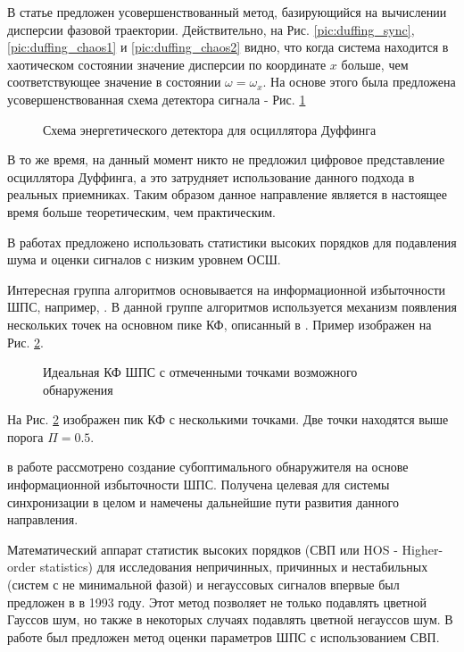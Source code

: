 В статье \cite{chaos_chen} предложен усовершенствованный метод, базирующийся на вычислении дисперсии
фазовой траектории. Действительно, на Рис. \ref{pic:duffing_sync}, \ref{pic:duffing_chaos1} и
\ref{pic:duffing_chaos2} видно, что когда система находится в хаотическом состоянии значение
дисперсии по координате ${x}$ больше, чем соответствующее значение в состоянии $\omega = \omega_{x}$.
На основе этого была предложена усовершенствованная схема детектора сигнала - Рис. \ref{pic:chaos_energy_detector}
\begin{figure}[h]
	\center{}
	\caption{Схема энергетического детектора для осциллятора Дуффинга}
	\label{pic:chaos_energy_detector}
\end{figure}

В то же время, на данный момент никто не предложил цифровое представление осциллятора Дуффинга, а это затрудняет использование данного подхода
в реальных приемниках. Таким образом данное направление является в настоящее время больше теоретическим, чем практическим.

В работах \cite{hos_petropulu, hos_zhao} предложено использовать статистики высоких порядков для подавления шума и оценки
сигналов с низким уровнем ОСШ.

Интересная группа алгоритмов основывается на информационной избыточности ШПС, например, \cite{phd_che}. В данной
группе алгоритмов используется механизм появления нескольких точек на основном пике КФ, описанный в \cite{kaplan}. Пример
изображен на Рис. \ref{pic:sec1_peak_tcd}.
\begin{figure}[h]
	\center{}
	\caption{Идеальная КФ ШПС с отмеченными точками возможного обнаружения}
	\label{pic:sec1_peak_tcd}
\end{figure}

На Рис. \ref{pic:sec1_peak_tcd} изображен пик КФ с несколькими точками. Две точки находятся выше порога ${\Pi=0.5}$.

в работе \cite{phd_che} рассмотрено создание субоптимального обнаружителя на основе информационной избыточности ШПС.
Получена целевая для системы синхронизации в целом и намечены дальнейшие пути развития данного направления.

Математический аппарат статистик высоких порядков (СВП или HOS - Higher-order statistics)
для исследования непричинных, причинных и нестабильных
(систем с не минимальной фазой) и негауссовых сигналов впервые был предложен в \cite{hos_petropulu} в 1993 году.
Этот метод позволяет не только подавлять цветной Гауссов шум, но также в некоторых случаях подавлять
цветной негауссов шум. В работе \cite{hos_zhao} был предложен метод оценки параметров ШПС с использованием СВП.

